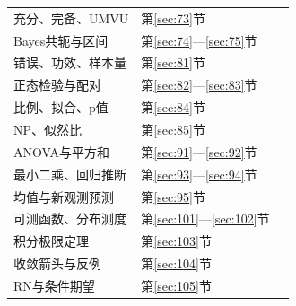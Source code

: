\begin{longtable}{@{}p{}p{}p{}@{}}
充分、完备、UMVU&第\ref{sec:73}节&\pageref{sec:73}\\
Bayes共轭与区间&第\ref{sec:74}—\ref{sec:75}节&\pageref{sec:74}\\
错误、功效、样本量&第\ref{sec:81}节&\pageref{sec:81}\\
正态检验与配对&第\ref{sec:82}—\ref{sec:83}节&\pageref{sec:82}\\
比例、拟合、p值&第\ref{sec:84}节&\pageref{sec:84}\\
NP、似然比&第\ref{sec:85}节&\pageref{sec:85}\\
ANOVA与平方和&第\ref{sec:91}—\ref{sec:92}节&\pageref{sec:91}\\
最小二乘、回归推断&第\ref{sec:93}—\ref{sec:94}节&\pageref{sec:93}\\
均值与新观测预测&第\ref{sec:95}节&\pageref{sec:95}\\
可测函数、分布测度&第\ref{sec:101}—\ref{sec:102}节&\pageref{sec:101}\\
积分极限定理&第\ref{sec:103}节&\pageref{sec:103}\\
收敛箭头与反例&第\ref{sec:104}节&\pageref{sec:104}\\
RN与条件期望&第\ref{sec:105}节&\pageref{sec:105}\\\bottomrule
\end{longtable}
